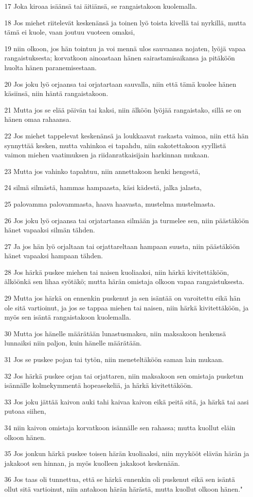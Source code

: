 \par 17 Joka kiroaa isäänsä tai äitiänsä, se rangaistakoon kuolemalla.
\par 18 Jos miehet riitelevät keskenänsä ja toinen lyö toista kivellä tai nyrkillä, mutta tämä ei kuole, vaan joutuu vuoteen omaksi,
\par 19 niin olkoon, jos hän tointuu ja voi mennä ulos sauvaansa nojaten, lyöjä vapaa rangaistuksesta; korvatkoon ainoastaan hänen sairastamisaikansa ja pitäköön huolta hänen paranemisestaan.
\par 20 Jos joku lyö orjaansa tai orjatartaan sauvalla, niin että tämä kuolee hänen käsiinsä, niin häntä rangaistakoon.
\par 21 Mutta jos se elää päivän tai kaksi, niin älköön lyöjää rangaistako, sillä se on hänen omaa rahaansa.
\par 22 Jos miehet tappelevat keskenänsä ja loukkaavat raskasta vaimoa, niin että hän synnyttää kesken, mutta vahinkoa ei tapahdu, niin sakotettakoon syyllistä vaimon miehen vaatimuksen ja riidanratkaisijain harkinnan mukaan.
\par 23 Mutta jos vahinko tapahtuu, niin annettakoon henki hengestä,
\par 24 silmä silmästä, hammas hampaasta, käsi kädestä, jalka jalasta,
\par 25 palovamma palovammasta, haava haavasta, mustelma mustelmasta.
\par 26 Jos joku lyö orjaansa tai orjatartansa silmään ja turmelee sen, niin päästäköön hänet vapaaksi silmän tähden.
\par 27 Ja jos hän lyö orjaltaan tai orjattareltaan hampaan suusta, niin päästäköön hänet vapaaksi hampaan tähden.
\par 28 Jos härkä puskee miehen tai naisen kuoliaaksi, niin härkä kivitettäköön, älköönkä sen lihaa syötäkö; mutta härän omistaja olkoon vapaa rangaistuksesta.
\par 29 Mutta jos härkä on ennenkin puskenut ja sen isäntää on varoitettu eikä hän ole sitä vartioinut, ja jos se tappaa miehen tai naisen, niin härkä kivitettäköön, ja myös sen isäntä rangaistakoon kuolemalla.
\par 30 Mutta jos hänelle määrätään lunastusmaksu, niin maksakoon henkensä lunnaiksi niin paljon, kuin hänelle määrätään.
\par 31 Jos se puskee pojan tai tytön, niin meneteltäköön saman lain mukaan.
\par 32 Jos härkä puskee orjan tai orjattaren, niin maksakoon sen omistaja pusketun isännälle kolmekymmentä hopeasekeliä, ja härkä kivitettäköön.
\par 33 Jos joku jättää kaivon auki tahi kaivaa kaivon eikä peitä sitä, ja härkä tai aasi putoaa siihen,
\par 34 niin kaivon omistaja korvatkoon isännälle sen rahassa; mutta kuollut eläin olkoon hänen.
\par 35 Jos jonkun härkä puskee toisen härän kuoliaaksi, niin myykööt elävän härän ja jakakoot sen hinnan, ja myös kuolleen jakakoot keskenään.
\par 36 Jos taas oli tunnettua, että se härkä ennenkin oli puskenut eikä sen isäntä ollut sitä vartioinut, niin antakoon härän härästä, mutta kuollut olkoon hänen."

